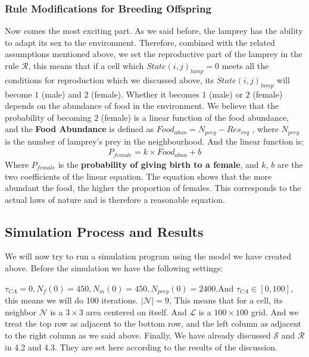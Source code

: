 \documentclass{mcmthesis}
\begin{document}
\subsubsection{Rule Modifications for Breeding Offspring}
Now comes the most exciting part. As we said before, the lamprey has the ability to adapt its sex to the environment. Therefore, combined with the related assumptions mentioned above, we set the reproductive part of the lamprey in the rule ${\displaystyle {\mathcal {R}}}$, this means that if a cell which $State(i,j)_{lamp}= 0$ meets all the conditions for reproduction which we discussed above, its $State(i,j)_{lamp}$ will become $1$ (male) and $2$ (female). Whether it becomes $1$ (male) or $2$ (female) depends on the abundance of food in the environment. We believe that the probability of becoming $2$ (female) is a linear function of the food abundance, and the \textbf{Food Abundance} is defined as $Food_{abun} = N_{prey} - Res_{req}$ , where $N_{prey}$ is the number of lamprey's prey in the neighbourhood. And the linear function is:
\begin{align}
P_{female} = k\times Food_{abun} + b
\end{align}
Where $P_{female}$ is the \textbf{probability of giving birth to a female}, and $k$, $b$ are the two coefficients of the linear equation. The equation shows that the more abundant the food, the higher the proportion of females. This corresponds to the actual laws of nature and is therefore a reasonable equation.

\subsection{Simulation Process and Results}
We will now try to run a simulation program using the model we have created above. Before the simulation we have the following settings:

$\tau_{CA} = 0, N_f(0) = 450, N_m(0) = 450, N_{prey}(0) = 2400. \text{And } \tau_{CA} \in \left[0, 100\right]$, this means we will do 100 iterations.
$\left|{\displaystyle {\mathcal {N}}} \right| = 9$, This means that for a cell, its neighbor ${\displaystyle {\mathcal {N}}}$ is a $3\times 3$ area centered on itself. And ${\displaystyle {\mathcal {L}}}$ is a $100\times 100$ grid. And  we treat the top row as adjacent to the bottom row, and the left column as adjacent to the right column as we said above. Finally, We have already discussed ${\displaystyle {\mathcal {S}}}$ and ${\displaystyle {\mathcal {R}}}$ in 4.2 and 4.3. They are set here according to the results of the discussion.
\end{document}

